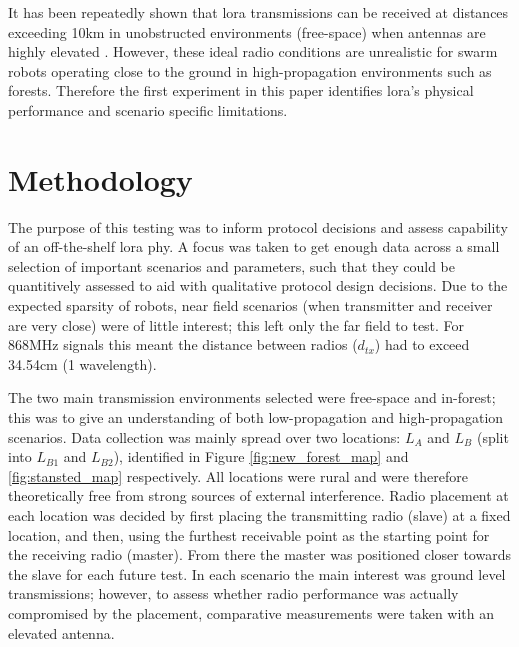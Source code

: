 It has been repeatedly shown that \ac{lora} transmissions can be received at distances exceeding 10km in  unobstructed environments (free-space) when antennas are highly elevated \cite{3YP:LORA_RANGE_REVIEW}. However, these ideal radio conditions are unrealistic for swarm robots operating close to the ground in high-propagation environments such as forests. Therefore the first experiment in this paper identifies \ac{lora}'s physical performance and scenario specific limitations. 

\section{Methodology}
The purpose of this testing was to inform protocol decisions and assess capability of an off-the-shelf \ac{lora} \ac{phy}. A focus was taken to get enough data across a small selection of important scenarios and parameters, such that they could be quantitively assessed to aid with qualitative protocol design decisions. Due to the expected sparsity of robots, near field scenarios (when transmitter and receiver are very close) were of little interest; this left only the far field to test. For 868MHz signals this meant the distance between radios ($d_{tx}$) had to exceed 34.54cm (1 wavelength). 

 The two main transmission environments selected were free-space and in-forest; this was to give an understanding of both low-propagation and high-propagation scenarios. Data collection was mainly spread over two locations: \textbf{$L_{A}$} and \textbf{$L_{B}$} (split into \textbf{$L_{B1}$} and \textbf{$L_{B2}$}), identified in Figure \ref{fig:new_forest_map} and \ref{fig:stansted_map} respectively. All locations were rural and were therefore theoretically free from strong sources of external interference. Radio placement at each location was decided by first placing the transmitting radio (slave) at a fixed location, and then, using the furthest receivable point as the starting point for the receiving radio (master). From there the master was positioned closer towards the slave for each future test. In each scenario the main interest was ground level transmissions; however, to assess whether radio performance was actually compromised by the placement, comparative measurements were taken with an elevated antenna. 
 

